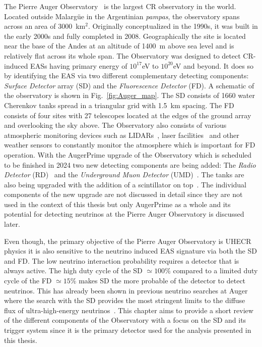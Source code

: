 The Pierre Auger Observatory~\cite{Auger:2015} is the largest CR observatory in the world. Located outside Malargüe in the Argentinian \textit{pampas}, the observatory spans across an area of 3000 km$^2$. Originally conceptualized in the 1990s, it was built in the early 2000s and fully completed in 2008. Geographically the site is located near the base of the Andes at an altitude of 1400 m above sea level and is relatively flat across its whole span. The Observatory was designed to detect CR-induced EASs having primary energy of $10^{17}$eV to $10^{20}$eV and beyond. It does so by identifying the EAS via two different complementary detecting components: \textit{Surface Detector} array (SD) and the \textit{Fluorescence Detector} (FD). A schematic of the observatory is shown in Fig.~\ref{fig:Auger_map}. The SD consists of 1660 water Cherenkov tanks spread in a triangular grid with 1.5 km spacing. The FD consists of four sites with 27 telescopes located at the edges of the ground array and overlooking the sky above. The Observatory also consists of various atmospheric monitoring devices such as LIDARs~\cite{BENZVI2007171}, laser facilities~\cite{article_clf,Lawrence_Wiencke_2009} and other weather sensors to constantly monitor the atmosphere which is important for FD operation. With the AugerPrime upgrade of the Observatory which is scheduled to be finished in 2024 two new detecting components are being added: The \textit{Radio Detector} (RD)~\cite{Horandel:2023XL} and the \textit{Underground Muon Detector} (UMD)~\cite{AbdulHalim:2023ZF}. The tanks are also being upgraded with the addition of a scintillator on top~\cite{Cataldi:2021uwd}. The individual components of the new upgrade are not discussed in detail since they are not used in the context of this thesis but only AugerPrime as a whole and its potential for detecting neutrinos at the Pierre Auger Observatory is discussed later.

Even though, the primary objective of the Pierre Auger Observatory is UHECR physics it is also sensitive to the neutrino induced EAS signature via both the SD and FD. The low neutrino interaction probability requires a detector that is always active. The high duty cycle of the SD $\simeq 100$\% compared to a limited duty cycle of the FD $\simeq 15$\% makes SD the more probable of the detector to detect neutrinos. This has already been shown in previous neutrino searches at Auger where the search with the SD provides the most stringent limits to the diffuse flux of ultra-high-energy neutrinos~\cite{Aab_2019_diffuse}. This chapter aims to provide a short review of the different components of the Observatory with a focus on the SD and its trigger system since it is the primary detector used for the analysis presented in this thesis. 

